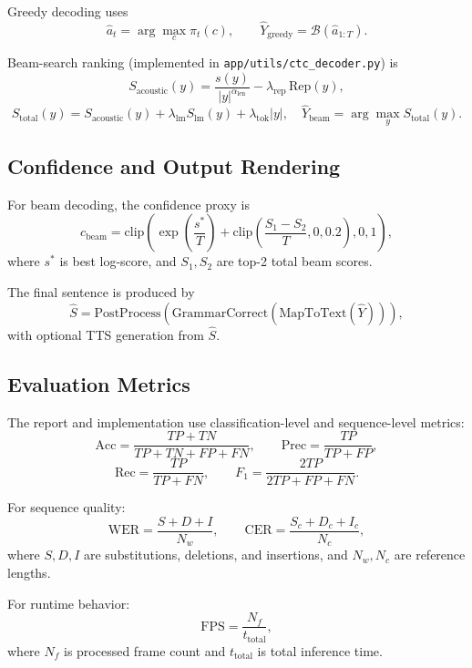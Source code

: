 Greedy decoding uses
\begin{equation}
\hat{a}_t = \arg\max_c \pi_t(c),
\qquad
\hat{Y}_{\mathrm{greedy}} = \mathcal{B}(\hat{a}_{1:T}).
\end{equation}

Beam-search ranking (implemented in \texttt{app/utils/ctc\_decoder.py}) is
\begin{equation}
S_{\mathrm{acoustic}}(y) = \frac{s(y)}{|y|^{\alpha_{\mathrm{len}}}} - \lambda_{\mathrm{rep}}\,\mathrm{Rep}(y),
\end{equation}
\begin{equation}
S_{\mathrm{total}}(y)=S_{\mathrm{acoustic}}(y)+\lambda_{\mathrm{lm}}S_{\mathrm{lm}}(y)+\lambda_{\mathrm{tok}}|y|,
\quad
\hat{Y}_{\mathrm{beam}}=\arg\max_y S_{\mathrm{total}}(y).
\end{equation}

\subsection{Confidence and Output Rendering}
For beam decoding, the confidence proxy is
\begin{equation}
c_{\mathrm{beam}}=\mathrm{clip}\!\left(\exp\left(\frac{s^*}{T}\right)+\mathrm{clip}\left(\frac{S_1-S_2}{T},0,0.2\right),0,1\right),
\end{equation}
where $s^*$ is best log-score, and $S_1,S_2$ are top-2 total beam scores.

The final sentence is produced by
\begin{equation}
\hat{S}=\mathrm{PostProcess}\!\left(\mathrm{GrammarCorrect}\!\left(\mathrm{MapToText}(\hat{Y})\right)\right),
\end{equation}
with optional TTS generation from $\hat{S}$.

\subsection{Evaluation Metrics}
The report and implementation use classification-level and sequence-level metrics:
\begin{equation}
\mathrm{Acc} = \frac{TP + TN}{TP + TN + FP + FN},
\qquad
\mathrm{Prec} = \frac{TP}{TP + FP},
\end{equation}
\begin{equation}
\mathrm{Rec} = \frac{TP}{TP + FN},
\qquad
F_1 = \frac{2TP}{2TP + FP + FN}.
\end{equation}

For sequence quality:
\begin{equation}
\mathrm{WER} = \frac{S + D + I}{N_w},
\qquad
\mathrm{CER} = \frac{S_c + D_c + I_c}{N_c},
\end{equation}
where $S,D,I$ are substitutions, deletions, and insertions, and $N_w,N_c$ are reference lengths.

For runtime behavior:
\begin{equation}
\mathrm{FPS} = \frac{N_f}{t_{\mathrm{total}}},
\end{equation}
where $N_f$ is processed frame count and $t_{\mathrm{total}}$ is total inference time.

